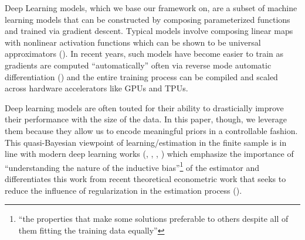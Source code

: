 \documentclass[a4paper,12pt]{article}
\begin{document}
Deep Learning models, which we base our framework on, are a subset of machine learning models that can be constructed by composing parameterized functions and trained via gradient descent. Typical models involve composing linear maps with nonlinear activation functions which can be shown to be universal approximators  (\cite{hornik1989multilayer}). In recent years, such models have become easier to train as gradients are computed ``automatically'' often via reverse mode automatic differentiation (\cite{griewank2008evaluating}) and the entire training process can be compiled and scaled across hardware accelerators like GPUs and TPUs. \par 
Deep learning models are often touted for their ability to drasticially improve their performance with the size of the data. In this paper, though, we leverage them because they allow us to encode meaningful priors in a controllable fashion. This quasi-Bayesian viewpoint of learning/estimation in the finite sample is in line with modern deep learning works (\cite{belkin2018reconciling},  \cite{nagarajan2019uniform}, \cite{wilson2020case}, \cite{belkin2021fit}) which emphasize the importance of ``understanding the nature of the inductive bias''\footnote{\cite{belkin2021fit} ``the properties that make some solutions preferable to others despite all of them fitting the training data equally''} of the estimator and differentiates this work from recent theoretical econometric work that seeks to reduce the influence of regularization in the estimation process (\cite{chernozhukov2018double}). \par 
\end{document}
